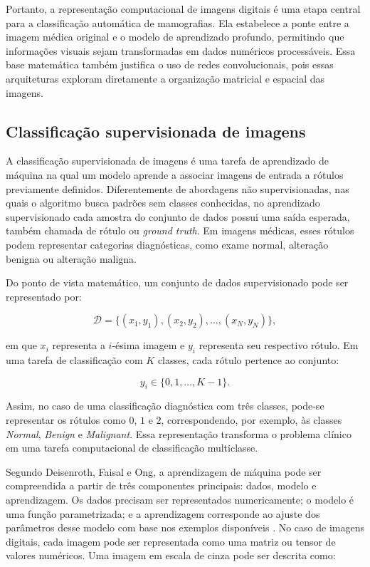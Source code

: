 \documentclass[
    12pt,
    openright,
    oneside,
    a4paper,
    english,
    brazil
]{abntex2}
\begin{document}
Portanto, a representação computacional de imagens digitais é uma etapa central para a classificação automática de mamografias. Ela estabelece a ponte entre a imagem médica original e o modelo de aprendizado profundo, permitindo que informações visuais sejam transformadas em dados numéricos processáveis. Essa base matemática também justifica o uso de redes convolucionais, pois essas arquiteturas exploram diretamente a organização matricial e espacial das imagens.

\subsection{Classificação supervisionada de imagens}
\label{subsec:classificacao_supervisionada_imagens}

A classificação supervisionada de imagens é uma tarefa de aprendizado de máquina na qual um modelo aprende a associar imagens de entrada a rótulos previamente definidos. Diferentemente de abordagens não supervisionadas, nas quais o algoritmo busca padrões sem classes conhecidas, no aprendizado supervisionado cada amostra do conjunto de dados possui uma saída esperada, também chamada de rótulo ou \textit{ground truth}. Em imagens médicas, esses rótulos podem representar categorias diagnósticas, como exame normal, alteração benigna ou alteração maligna.

Do ponto de vista matemático, um conjunto de dados supervisionado pode ser representado por:

\[
\mathcal{D} =
\{(x_1,y_1),(x_2,y_2),\ldots,(x_N,y_N)\},
\]

em que \(x_i\) representa a \(i\)-ésima imagem e \(y_i\) representa seu respectivo rótulo. Em uma tarefa de classificação com \(K\) classes, cada rótulo pertence ao conjunto:

\[
y_i \in \{0,1,\ldots,K-1\}.
\]

Assim, no caso de uma classificação diagnóstica com três classes, pode-se representar os rótulos como \(0\), \(1\) e \(2\), correspondendo, por exemplo, às classes \textit{Normal}, \textit{Benign} e \textit{Malignant}. Essa representação transforma o problema clínico em uma tarefa computacional de classificação multiclasse.

Segundo Deisenroth, Faisal e Ong, a aprendizagem de máquina pode ser compreendida a partir de três componentes principais: dados, modelo e aprendizagem. Os dados precisam ser representados numericamente; o modelo é uma função parametrizada; e a aprendizagem corresponde ao ajuste dos parâmetros desse modelo com base nos exemplos disponíveis \cite{deisenroth2020mathematics}. No caso de imagens digitais, cada imagem pode ser representada como uma matriz ou tensor de valores numéricos. Uma imagem em escala de cinza pode ser descrita como:
\end{document}
